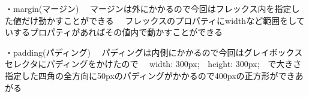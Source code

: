 ・margin(マージン)
　マージンは外にかかるので今回はフレックス内を指定した値だけ動かすことができる
　フレックスのプロパティにwidthなど範囲をしていするプロパティがあればその値内で動かすことができる

・padding(パディング)
　パディングは内側にかかるので今回はグレイボックスセレクタにパディングをかけたので
　width: 300px;　height: 300px;　で大きさ指定した四角の全方向に50pxのパディングがかかるので400pxの正方形ができあがる

